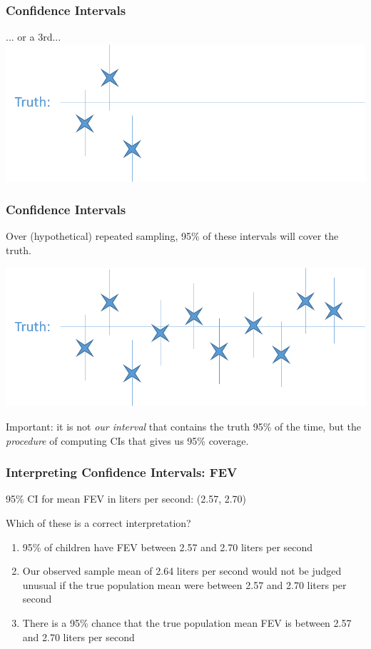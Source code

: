 \documentclass[12pt, 
hyperref={colorlinks=true, linkcolor=blue, urlcolor=cyan}]{beamer}
\begin{document}
\begin{frame}[noframenumbering]
\frametitle{Confidence Intervals}

... or a 3rd... \\

\includegraphics[width=\textwidth]{./ci_3} 
\end{frame}

\begin{frame}[noframenumbering]
\frametitle{Confidence Intervals}

Over (hypothetical) repeated sampling, 95\% of these intervals will cover the truth.

\includegraphics[width=\textwidth]{./ci_4} %

\begin{footnotesize} \color{blue}Important: \color{black} it is not \textit{our interval} that contains the truth 95\% of the time, but the \textit{procedure} of computing CIs that gives us 95\% coverage.  \end{footnotesize}

\end{frame}

\begin{frame}
\frametitle{Interpreting Confidence Intervals: FEV}

95\% CI for mean FEV in liters per second: (2.57, 2.70)

Which of these is a correct interpretation? 
\begin{enumerate}
\item 95\% of children have FEV between 2.57 and 2.70 liters per second
\item Our observed sample mean of 2.64 liters per second would not be judged unusual if the true population mean were between 2.57 and 2.70 liters per second
\item There is a 95\% chance that the true population mean FEV is between 2.57 and 2.70 liters per second
\end{enumerate}

\end{frame}
\end{document}
